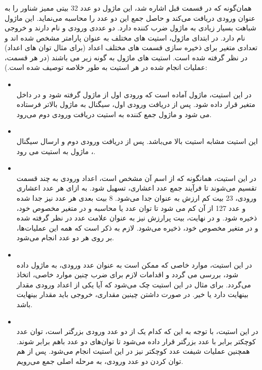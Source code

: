 \documentclass[12pt,titlepage,a4page , tikz , multi,table , svgnames,xcdraw]{article}
\begin{document}
\subsubsection{}
همان‌گونه که در قسمت قبل اشاره شد، این ماژول دو عدد 32 بیتی ممیز شناور را به عنوان ورودی دریافت می‌کند و حاصل جمع این دو عدد را محاسبه می‌نماید. این ماژول شباهت بسیار زیادی به ماژول ضرب کننده دارد. دو عددی ورودی 
 و 
 نام دارند و خروجی 
 نام دارد. در ابتدای ماژول، استیت های مختلف به عنوان پارامتر مشخص شده اند و تعدادی متغیر برای ذخیره سازی قسمت های مختلف اعداد (برای مثال توان های اعداد) در نظر گرفته شده است. استیت های ماژول به گونه زیر می باشند (در هر قسمت، عملیات انجام شده در هر استیت به طور خلاصه توصیف شده است.): 
\begin{itemize}
\item {} \\
در این استیت، ماژول آماده است که ورودی اول از ماژول  گرفته شود و در داخل متغیر  قرار داده شود. پس از دریافت ورودی اول، سیگنال  به ماژول بالاتر فرستاده می شود و ماژول جمع کننده به استیت دریافت ورودی دوم می‌رود.
\item {} \\
این استیت مشابه استیت بالا می‌باشد. پس از دریافت ورودی دوم و ارسال سیگنال ، ماژول به استیت  می رود.
\item {} \\
در این استیت، همانگونه که از اسم آن مشخص است، اعداد ورودی به چند قسمت تقسیم می‌شوند تا فرآیند جمع عدد اعشاری، تسهیل شود. به ازای هر عدد اعشاری ورودی، 23 بیت کم ارزش به عنوان  جدا می‌شود. 8 بیت بعدی هر عدد نیز جدا شده و عدد 127 از آن کم می شود تا توان عدد یا  محاسبه و در متغیر مخصوص خود، ذخیره شود. و در نهایت، بیت پرارزش نیز به عنوان علامت عدد در نظر گرفته شده و در متغیر مخصوص خود، ذخیره می‌شود. لازم به ذکر است که همه این عملیات‌ها، بر روی هر دو عدد انجام می‌شود.
\item {} \\
در این استیت، موارد خاصی که ممکن است به عنوان عدد ورودی، به ماژول داده شود، بررسی می گردد و اقدامات لازم برای ضرب چنین موارد خاصی، اتخاذ می‌گردد. برای مثال در این استیت چک می‌شود که آیا یکی از اعداد ورودی مقدار بینهایت دارد یا خیر. در صورت داشتن چینین مقداری، خروجی باید مقدار بینهایت باشد.
\item {} \\
در این استیت، با توجه به این که کدام یک از دو عدد ورودی بزرگتر است، توان عدد کوچکتر برابر با عدد بزرگتر قرار داده می‌شود تا توان‌های دو عدد باهم برابر شوند. همچنین عملیات شیفت  عدد کوچکتر نیز در این استیت انجام می‌شود. پس از هم توان کردن دو عدد ورودی، به مرحله اصلی جمع می‌رویم.



\end{itemize}
\end{document}
